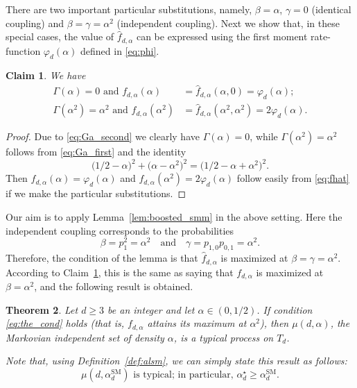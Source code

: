 \documentclass[12pt]{amsart}
\newtheorem{theorem}{Theorem}[section]
\newtheorem{claim}[theorem]{Claim}
\theoremstyle{definition}
\newcommand\fhat{\hat{f}}
\newcommand\al{\alpha}
\newcommand\be{\beta}
\newcommand\ga{\gamma}
\newcommand\Ga{\Gamma}
\newcommand\alstar{\alpha^{\star}}
\newcommand\alsm{\alpha^{\mathrm{SM}}}
\begin{document}
There are two important particular substitutions, namely, $\be=\al$, $\ga=0$ (identical coupling) and $\be=\ga=\al^2$ (independent coupling). Next we show that, in these special cases, the value of $\fhat_{d,\al}$ can be expressed using the first moment rate-function $\varphi_d(\al)$ defined in \eqref{eq:phi}. 
%
\begin{claim} \label{cl:special}
We have 
\begin{align*}
\Ga(\al) =0 \text{ and }
f_{d,\al}(\al) &= 
\fhat_{d,\al}(\al,0) = \varphi_d(\al) ; \\
\Ga(\al^2) = \al^2 \text{ and }
f_{d,\al}(\al^2) &= 
\fhat_{d,\al}(\al^2,\al^2) = 2 \varphi_d(\al) .
\end{align*}
\end{claim}
%
\begin{proof}
Due to \eqref{eq:Ga_second} we clearly have $\Ga(\al)=0$, while $\Ga(\al^2)=\al^2$ follows from \eqref{eq:Ga_first} and the identity 
%
\begin{equation} \label{eq:identity}
\big( 1/2 - \al \big)^2 
+ \big( \al - \al^2 \big)^2 
= \big( 1/2 - \al + \al^2 \big)^2 .
\end{equation}
%
Then $f_{d,\al}(\al)=\varphi_d(\al)$ and $f_{d,\al}(\al^2)=2\varphi_d(\al)$ follow easily from \eqref{eq:fhat} if we make the particular substitutions.
\end{proof}
%

Our aim is to apply Lemma~\ref{lem:boosted_smm} in the above setting. Here the independent coupling corresponds to the probabilities 
%
\[ \be = %
p_1^2=\al^2 
\quad \text{and} \quad 
\ga = %
p_{1,0}p_{0,1} = \al^2 .\]
%
Therefore, the condition of the lemma is that $\fhat_{d,\al}$ is maximized at $\be=\ga=\al^2$. According to Claim~\ref{cl:special}, this is the same as saying that $f_{d,\al}$ is maximized at $\be=\al^2$, and the following result is obtained. 
%
\begin{theorem} \label{thm:Markovian_indep}
Let $d \geq 3$ be an integer and let $\al \in (0,1/2)$. If condition \eqref{eq:the_cond} holds (that is, $f_{d,\al}$ attains its maximum at $\al^2$), then $\mu(d,\al)$, the Markovian independent set of density $\al$, is a typical process on $T_d$.

Note that, using Definition~\ref{def:alsm}, we can simply state this result as follows: 
%
\begin{equation*}
\mu(d,\alsm_d) 
\text{ is typical; in particular, }
\alstar_d \geq \alsm_d .
\end{equation*}
%
\end{theorem}
%
\end{document}
